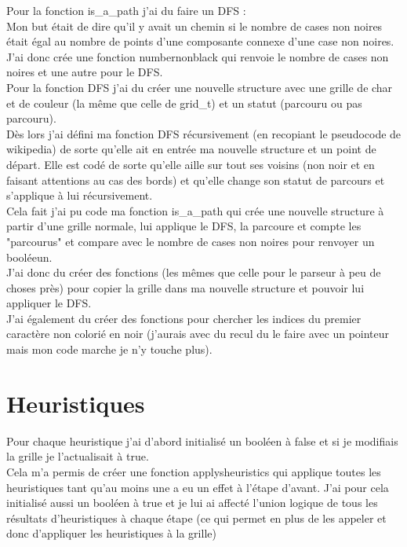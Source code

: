 \documentclass{article}
\begin{document}
Pour la fonction is\_a\_path j'ai du faire un DFS :\\
Mon but était de dire qu'il y avait un chemin si le nombre de cases non noires était égal au nombre de points d'une composante connexe d'une case non noires.\\
J'ai donc crée une fonction numbernonblack qui renvoie le nombre de cases non noires et une autre pour le DFS.\\
Pour la fonction DFS j'ai du créer une nouvelle structure avec une grille de char et de couleur (la même que celle de grid\_t) et un statut (parcouru ou pas parcouru).\\
Dès lors j'ai défini ma fonction DFS récursivement (en recopiant le pseudocode de wikipedia) de sorte qu'elle ait en entrée ma nouvelle structure et un point de départ. Elle est codé de sorte qu'elle aille sur tout ses voisins (non noir et en faisant attentions au cas des bords) et qu'elle change son statut de parcours et s'applique à lui récursivement.\\
Cela fait j'ai pu code ma fonction is\_a\_path qui crée une nouvelle structure à partir d'une grille normale, lui applique le DFS, la parcoure et compte les "parcourus" et compare avec le nombre de cases non noires pour renvoyer un booléeun.\\
J'ai donc du créer des fonctions (les mêmes que celle pour le parseur à peu de choses près) pour copier la grille dans ma nouvelle structure et pouvoir lui appliquer le DFS.\\
J'ai également du créer des fonctions pour chercher les indices du premier caractère non colorié en noir (j'aurais avec du recul du le faire avec un pointeur mais mon code marche je n'y touche plus).\\

\newpage
\section{Heuristiques}

Pour chaque heuristique j'ai d'abord initialisé un booléen à false et si je modifiais la grille je l'actualisait à true. \\

Cela m'a permis de créer une fonction applysheuristics qui applique toutes les heuristiques tant qu'au moins une a eu un effet à l'étape d'avant. J'ai pour cela initialisé aussi un booléen à true et je lui ai affecté l'union logique de tous les résultats d'heuristiques à chaque étape (ce qui permet en plus de les appeler et donc d'appliquer les heuristiques à la grille)
\end{document}
